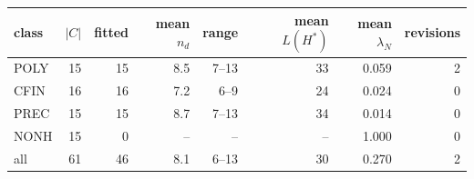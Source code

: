 \begin{tabular}{lrrrrrrr}
\toprule
class & $|C|$ & fitted & mean $n_d$ & range & mean $L(H^*)$ & mean $\lambda_N$ & revisions \\
\midrule
POLY & 15 & 15 & 8.5 & 7--13 & 33 & 0.059 & 2 \\
CFIN & 16 & 16 & 7.2 & 6--9 & 24 & 0.024 & 0 \\
PREC & 15 & 15 & 8.7 & 7--13 & 34 & 0.014 & 0 \\
NONH & 15 & 0 & -- & -- & -- & 1.000 & 0 \\
\midrule
all & 61 & 46 & 8.1 & 6--13 & 30 & 0.270 & 2 \\
\bottomrule
\end{tabular}